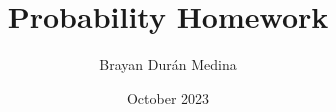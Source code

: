 \documentclass{report}
\title{Probability Homework}
\author{Brayan Durán Medina}
\date{October 2023}
\begin{document}
\maketitle



\break



\break



\break



\break



\break



\break


\end{document}
